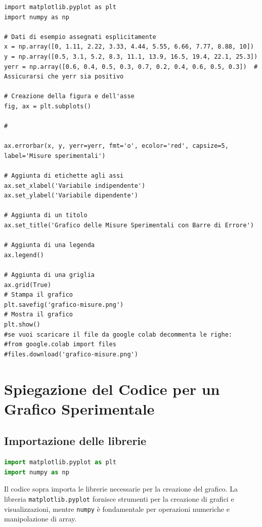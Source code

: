\documentclass[a4paper,12pt]{article}
\begin{document}
\begin{lstlisting}[caption={Grafico delle misure sperimentali con barre di errore}]
import matplotlib.pyplot as plt
import numpy as np

# Dati di esempio assegnati esplicitamente
x = np.array([0, 1.11, 2.22, 3.33, 4.44, 5.55, 6.66, 7.77, 8.88, 10])
y = np.array([0.5, 3.1, 5.2, 8.3, 11.1, 13.9, 16.5, 19.4, 22.1, 25.3])
yerr = np.array([0.6, 0.4, 0.5, 0.3, 0.7, 0.2, 0.4, 0.6, 0.5, 0.3])  # Assicurarsi che yerr sia positivo

# Creazione della figura e dell'asse
fig, ax = plt.subplots()

# 

ax.errorbar(x, y, yerr=yerr, fmt='o', ecolor='red', capsize=5, label='Misure sperimentali')

# Aggiunta di etichette agli assi
ax.set_xlabel('Variabile indipendente')
ax.set_ylabel('Variabile dipendente')

# Aggiunta di un titolo
ax.set_title('Grafico delle Misure Sperimentali con Barre di Errore')

# Aggiunta di una legenda
ax.legend()

# Aggiunta di una griglia
ax.grid(True)
# Stampa il grafico
plt.savefig('grafico-misure.png')
# Mostra il grafico
plt.show()
#se vuoi scaricare il file da google colab decommenta le righe:
#from google.colab import files
#files.download('grafico-misure.png')

\end{lstlisting}

\section{Spiegazione del Codice per un Grafico Sperimentale}

\subsection{Importazione delle librerie}
\begin{lstlisting}[language=Python, caption=Importazione delle librerie]
import matplotlib.pyplot as plt
import numpy as np
\end{lstlisting}
Il codice sopra importa le librerie necessarie per la creazione del grafico. La libreria \texttt{matplotlib.pyplot} fornisce strumenti per la creazione di grafici e visualizzazioni, mentre \texttt{numpy} è fondamentale per operazioni numeriche e manipolazione di array.
\end{document}
